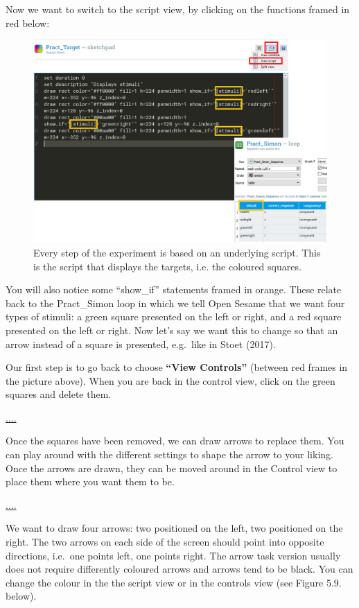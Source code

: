 \documentclass[
]{book}
\begin{document}
Now we want to switch to the script view, by clicking on the functions framed in red below:

\begin{figure}

{\centering \includegraphics[width=0.99\linewidth]{images/changesimon/02Script} 

}

\caption{Every step of the experiment is based on an underlying script. This is the script that displays the targets, i.e. the coloured squares.}\label{fig:Figure3-6}
\end{figure}

You will also notice some ``show\_if'' statements framed in orange. These relate back to the Pract\_Simon loop in which we tell Open Sesame that we want four types of stimuli: a green square presented on the left or right, and a red square presented on the left or right. Now let's say we want this to change so that an arrow instead of a square is presented, e.g.~like in Stoet (2017).

Our first step is to go back to choose \textbf{``View Controls''} (between red frames in the picture above). When you are back in the control view, click on the green squares and delete them.

\url{....}

Once the squares have been removed, we can draw arrows to replace them. You can play around with the different settings to shape the arrow to your liking. Once the arrows are drawn, they can be moved around in the Control view to place them where you want them to be.

\url{....}

We want to draw four arrows: two positioned on the left, two positioned on the right. The two arrows on each side of the screen should point into opposite directions, i.e.~one points left, one points right. The arrow task version usually does not require differently coloured arrows and arrows tend to be black. You can change the colour in the the script view or in the controls view (see Figure 5.9. below).
\end{document}
